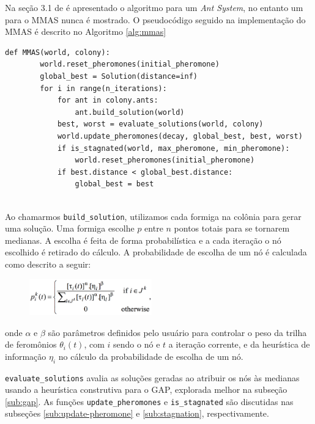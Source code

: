 Na seção 3.1 de \cite{de2005max} é apresentado o algoritmo para um \textit{Ant System}, no entanto um para o MMAS nunca é mostrado. O pseudocódigo seguido na implementação do MMAS é descrito no Algoritmo \ref{alg:mmas}

\medskip
\begin{lstlisting}[label=alg:mmas, caption=Pseudocódigo para o Min Max Ant System.]
	def MMAS(world, colony):
    	world.reset_pheromones(initial_pheromone)
        global_best = Solution(distance=inf)
        for i in range(n_iterations):
        	for ant in colony.ants:
            	ant.build_solution(world)
            best, worst = evaluate_solutions(world, colony)
            world.update_pheromones(decay, global_best, best, worst)
            if is_stagnated(world, max_pheromone, min_pheromone):
            	world.reset_pheromones(initial_pheromone)
            if best.distance < global_best.distance:
            	global_best = best
              
\end{lstlisting}
\medskip

Ao chamarmos \texttt{build\_solution}, utilizamos cada formiga na colônia para gerar uma solução. Uma formiga escolhe $p$ entre $n$ pontos totais para se tornarem medianas. A escolha é feita de forma probabilística e a cada iteração o nó escolhido é retirado do cálculo. A probabilidade de escolha de um nó é calculada como descrito a seguir:

\begin{figure}[H]	
  \centering
  \includegraphics[width=5.3cm,keepaspectratio]{images/probabilities.png}
\end{figure}

onde $\alpha$ e $\beta$ são parâmetros definidos pelo usuário para controlar o peso da trilha de feromônios $\theta_i(t)$, com $i$ sendo o nó e $t$ a iteração corrente, e da heurística de informação $\eta_i$ no cálculo da probabilidade de escolha de um nó.

\texttt{evaluate\_solutions} avalia as soluções geradas ao atribuir os nós às medianas usando a heurística construtiva para o GAP, explorada melhor na subseção \ref{sub:gap}. As funções \texttt{update\_pheromones} e \texttt{is\_stagnated} são discutidas nas subseções \ref{sub:update-pheromone} e \ref{sub:stagnation}, respectivamente.

